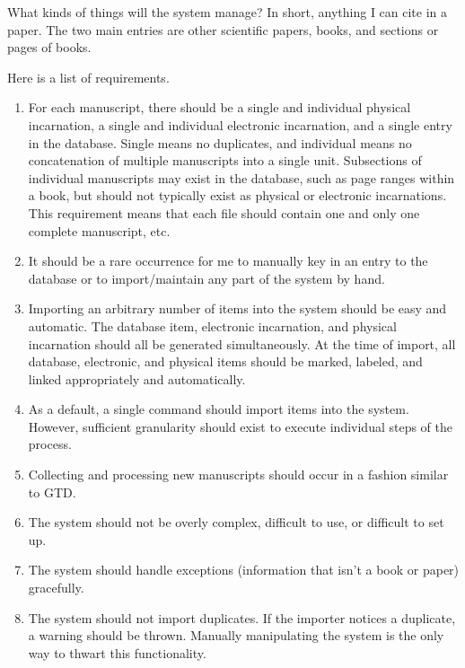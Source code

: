 \documentclass[letterpaper,12pt]{article}
\begin{document}
What kinds of things will the system manage? In short, anything I can cite in a paper. The two main entries are other scientific papers, books, and sections or pages of books.

Here is a list of requirements.

\begin{enumerate}
\item For each manuscript, there should be a single and individual physical incarnation, a single and individual electronic incarnation, and a single entry in the database. Single means no duplicates, and individual means no concatenation of multiple manuscripts into a single unit. Subsections of individual manuscripts may exist in the database, such as page ranges within a book, but should not typically exist as physical or electronic incarnations. This requirement means that each file should contain one and only one complete manuscript, etc.

\item It should be a rare occurrence for me to manually key in an entry to the database or to import/maintain any part of the system by hand.

\item Importing an arbitrary number of items into the system should be easy and automatic. The database item, electronic incarnation, and physical incarnation should all be generated simultaneously. At the time of import, all database, electronic, and physical items should be marked, labeled, and linked appropriately and automatically. 

\item As a default, a single command should import items into the system. However, sufficient granularity should exist to execute individual steps of the process.

\item Collecting and processing new manuscripts should occur in a fashion similar to GTD.

\item The system should not be overly complex, difficult to use, or difficult to set up. 

\item The system should handle exceptions (information that isn't a book or paper) gracefully. 

\item The system should not import duplicates. If the importer notices a duplicate, a warning should be thrown. Manually manipulating the system is the only way to thwart this functionality.


\end{enumerate}
\end{document}
